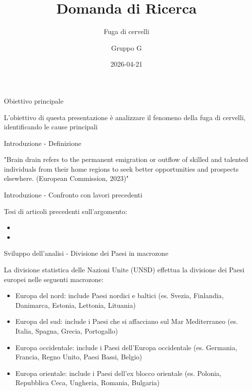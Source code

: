 \documentclass[
  ignorenonframetext,
]{beamer}
\title{\texorpdfstring{Domanda di Ricerca}{Domanda di Ricerca}}
\subtitle{\texorpdfstring{Fuga di cervelli}{Fuga di cervelli}}
\author{Gruppo G}
\date{2026-04-21}
\providecommand{\tightlist}{%
  \setlength{\itemsep}{0pt}\setlength{\parskip}{0pt}}
\begin{document}
\frame{\titlepage}


\begin{frame}{Obiettivo principale}
\protect{}\label{obiettivo-principale}
\begin{center}
L'obiettivo di questa presentazione è analizzare il fenomeno della fuga di cervelli, identificando le cause principali
\end{center}
\end{frame}

\begin{frame}{Introduzione - Definizione}
\protect{}\label{introduzione---definizione}
\begin{center}

"Brain drain refers to the permanent emigration or outflow of skilled and talented individuals from their home regions to seek better opportunities and prospects elsewhere. (European Commission, 2023)"

\end{center}
\end{frame}

\begin{frame}{Introduzione - Confronto con lavori precedenti}
\protect{}\label{introduzione---confronto-con-lavori-precedenti}
\begin{block}{Tesi di articoli precedenti sull'argomento:}
\protect{}\label{tesi-di-articoli-precedenti-sullargomento}
\begin{itemize}
\tightlist
\item
\item
\end{itemize}
\end{block}
\end{frame}

\begin{frame}{Sviluppo dell'analisi - Divisione dei Paesi in macrozone}
\protect{}\label{sviluppo-dellanalisi---divisione-dei-paesi-in-macrozone}
\begin{center}
La divisione statistica delle Nazioni Unite (UNSD) effettua la divisione dei Paesi europei nelle seguenti macrozone:
\end{center}

\begin{itemize}
\tightlist
\item
  Europa del nord: include Paesi nordici e baltici (es. Svezia,
  Finlandia, Danimarca, Estonia, Lettonia, Lituania)
\item
  Europa del sud: include i Paesi che si affacciano sul Mar Mediterraneo
  (es. Italia, Spagna, Grecia, Portogallo)
\item
  Europa occidentale: include i Paesi dell'Europa occidentale (es.
  Germania, Francia, Regno Unito, Paesi Bassi, Belgio)
\item
  Europa orientale: include i Paesi dell'ex blocco orientale (es.
  Polonia, Repubblica Ceca, Ungheria, Romania, Bulgaria)
\end{itemize}
\end{frame}
\end{document}
